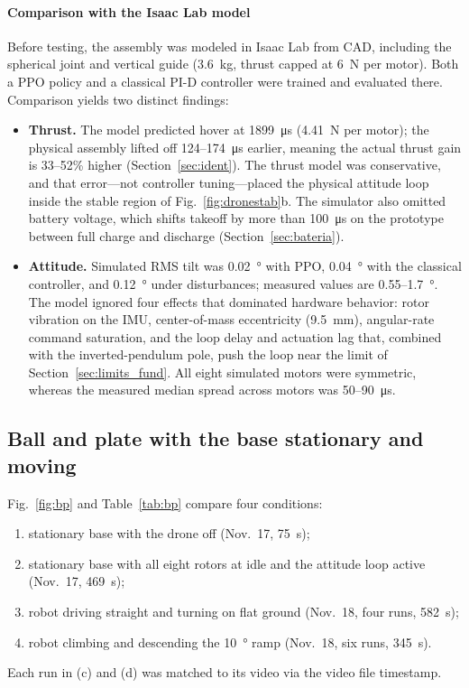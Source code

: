 \paragraph{Comparison with the Isaac Lab model}
Before testing, the assembly was modeled in Isaac Lab \cite{mittal2023} from CAD, including the spherical joint and vertical guide (\SI{3.6}{\kilo\gram}, thrust capped at \SI{6}{\newton} per motor). Both a PPO policy \cite{schulman2017} and a classical PI-D controller were trained and evaluated there. Comparison yields two distinct findings:
\begin{itemize}
  \item \textbf{Thrust.} The model predicted hover at \SI{1899}{\micro\second} (\SI{4.41}{\newton} per motor); the physical assembly lifted off 124--\SI{174}{\micro\second} earlier, meaning the actual thrust gain is 33--52\% higher (Section~\ref{sec:ident}). The thrust model was conservative, and that error---not controller tuning---placed the physical attitude loop inside the stable region of Fig.~\ref{fig:dronestab}b. The simulator also omitted battery voltage, which shifts takeoff by more than \SI{100}{\micro\second} on the prototype between full charge and discharge (Section~\ref{sec:bateria}).
  \item \textbf{Attitude.} Simulated RMS tilt was \SI{0.02}{\degree} with PPO, \SI{0.04}{\degree} with the classical controller, and \SI{0.12}{\degree} under disturbances; measured values are 0.55--\SI{1.7}{\degree}. The model ignored four effects that dominated hardware behavior: rotor vibration on the IMU, center-of-mass eccentricity (\SI{9.5}{\milli\metre}), angular-rate command saturation, and the loop delay and actuation lag that, combined with the inverted-pendulum pole, push the loop near the limit of Section~\ref{sec:limits_fund}. All eight simulated motors were symmetric, whereas the measured median spread across motors was 50--\SI{90}{\micro\second}.
\end{itemize}

\subsection{Ball and plate with the base stationary and moving}
Fig.~\ref{fig:bp} and Table~\ref{tab:bp} compare four conditions:
\begin{enumerate}[label=(\alph*)]
  \item stationary base with the drone off (Nov.~17, \SI{75}{\second});
  \item stationary base with all eight rotors at idle and the attitude loop active (Nov.~17, \SI{469}{\second});
  \item robot driving straight and turning on flat ground (Nov.~18, four runs, \SI{582}{\second});
  \item robot climbing and descending the \SI{10}{\degree} ramp (Nov.~18, six runs, \SI{345}{\second}).
\end{enumerate}
Each run in (c) and (d) was matched to its video via the video file timestamp.

